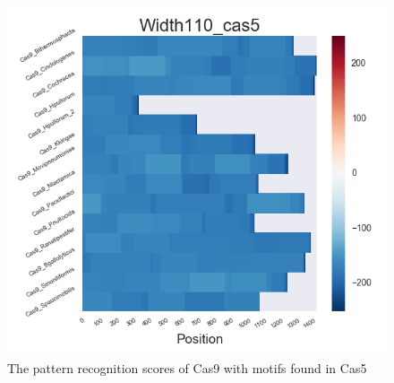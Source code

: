 \documentclass[11pt, oneside]{article}
\begin{document}
\begin{figure}[htbp]
\begin{minipage}{0.32\textwidth}
  \end{minipage}
  \hfill
  \begin{minipage}{0.32\textwidth}
    \centering
    \includegraphics[width=1\textwidth]{images/Width110_cas5_heatmap} %
  \end{minipage}
  \caption{The pattern recognition scores of Cas9 with motifs found in Cas5}
  \label{fig:cas5_recog}
\end{figure}
\end{document}
